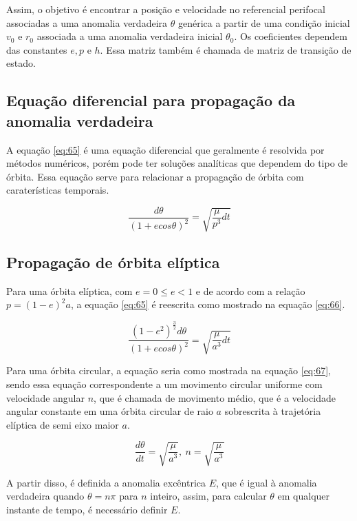 Assim, o objetivo é encontrar a posição e velocidade no referencial perifocal associadas a uma anomalia verdadeira $\theta$ genérica a partir de uma condição inicial $v_{0}$ e $r_{0}$ associada a uma anomalia verdadeira inicial $\theta_{0}$. Os coeficientes dependem das constantes $e, p$ e $h$. Essa matriz também é chamada de matriz de transição de estado.  

\subsection{Equação diferencial para propagação da anomalia verdadeira}

A equação \ref{eq:65} é uma equação diferencial que geralmente é resolvida por métodos numéricos, porém pode ter soluções analíticas que dependem do tipo de órbita. Essa equação serve para relacionar a propagação de órbita com caraterísticas temporais. 

\begin{equation}
 \frac{d\theta}{(1+ecos\theta)^{2}} = \sqrt{\frac{\mu}{p^{3}}dt}
 \label{eq:65}
\end{equation}

\subsection{Propagação de órbita elíptica}

Para uma órbita elíptica, com $e = 0 \leq e <1$ e de acordo com a relação $p = (1-e)^{2}a$, a equação \ref{eq:65} é reescrita como mostrado na equação \ref{eq:66}.

\begin{equation}
    \frac{(1-e^{2})^{\frac{3}{2}}d\theta}{(1+ecos\theta)^{2}} = \sqrt{\frac{\mu}{a^{3}}dt}
    \label{eq:66}
\end{equation}

Para uma órbita circular, a equação seria como mostrada na equação \ref{eq:67}, sendo essa equação correspondente a um movimento circular uniforme com velocidade angular $n$, que é chamada de movimento médio, que é a velocidade angular constante em uma órbita circular de raio $a$ sobrescrita à trajetória elíptica de semi eixo maior $a$. 

\begin{equation}
    \frac{d\theta}{dt} = \sqrt{\frac{\mu}{a^{3}}}, \ n = \sqrt{\frac{\mu}{a^{3}}}
    \label{eq:67}
\end{equation}

A partir disso, é definida a anomalia excêntrica $E$, que é igual à anomalia verdadeira quando $\theta = n\pi$ para $n$ inteiro, assim, para calcular $\theta$ em qualquer instante de tempo, é necessário definir $E$. 

